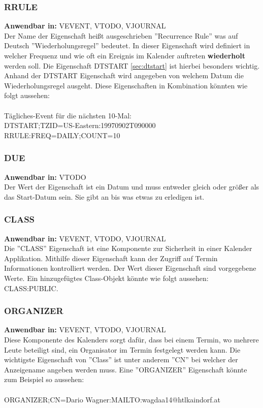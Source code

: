 \subsubsection{RRULE}
\label{sec:rrule}
\textbf{Anwendbar in:} VEVENT, VTODO, VJOURNAL \\
Der Name der Eigenschaft heißt ausgeschrieben ''Recurrence Rule'' was auf Deutsch ''Wiederholungsregel'' bedeutet. In dieser Eigenschaft wird definiert in welcher Frequenz und wie oft ein Ereignis im Kalender auftreten \textbf{wiederholt} werden soll. Die Eigenschaft DTSTART \ref{sec:dtstart} ist hierbei besonders wichtig. Anhand der DTSTART Eigenschaft wird angegeben von welchem Datum die Wiederholungsregel ausgeht. Diese Eigenschaften in Kombination könnten wie folgt aussehen: \\ \\
Tägliches-Event für die nächsten 10-Mal:\\
 DTSTART;TZID=US-Eastern:19970902T090000\\
 RRULE:FREQ=DAILY;COUNT=10\\
\subsubsection{DUE}
\label{sec:due}
\textbf{Anwendbar in:} VTODO\\
Der Wert der Eigenschaft ist ein Datum und muss entweder gleich oder größer als das Start-Datum sein. Sie gibt an bis was etwas zu erledigen ist. 
\subsubsection{CLASS}
\label{sec:class}
\textbf{Anwendbar in:} VEVENT, VTODO, VJOURNAL\\
Die ''CLASS'' Eigenschaft ist eine Komponente zur Sicherheit in einer Kalender Applikation. Mithilfe dieser Eigenschaft kann der Zugriff auf Termin Informationen kontrolliert werden. Der Wert dieser Eigenschaft sind vorgegebene Werte. Ein hinzugefügtes Class-Objekt könnte wie folgt aussehen: CLASS:PUBLIC.
\subsubsection{ORGANIZER}
\label{sec:organizer}
\textbf{Anwendbar in:} VEVENT, VTODO, VJOURNAL\\
Diese Komponente des Kalenders sorgt dafür, dass bei einem Termin, wo mehrere Leute beteiligt sind, ein Organisator im Termin festgelegt werden kann. Die wichtigste Eigenschaft von ''Class'' ist unter anderem ''CN'' bei welcher der Anzeigename angeben werden muss. Eine ''ORGANIZER'' Eigenschaft könnte zum Beispiel so aussehen: \\ \\ ORGANIZER;CN=Dario Wagner:MAILTO:wagdaa14@htlkaindorf.at\\
